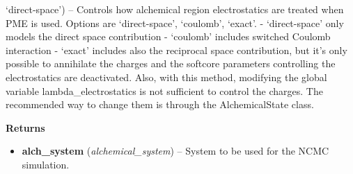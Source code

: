 \begin{description}
\begin{description}
\begin{itemize}
{  `direct-space'}) -- Controls how alchemical region electrostatics are
  treated when PME is used. Options are `direct-space', `coulomb',
  `exact'. - `direct-space' only models the direct space contribution -
  `coulomb' includes switched Coulomb interaction - `exact' includes
  also the reciprocal space contribution, but it's only possible to
  annihilate the charges and the softcore parameters controlling the
  electrostatics are deactivated. Also, with this method, modifying the
  global variable lambda\_electrostatics is not sufficient to control
  the charges. The recommended way to change them is through the
  AlchemicalState class.
\end{itemize}
\item
    \textbf{Returns}
\begin{itemize}
\item
    \textbf{alch\_system} (\emph{alchemical\_system}) -- System to be used for the NCMC simulation.
\end{itemize}
\end{description}
\end{description}


  


